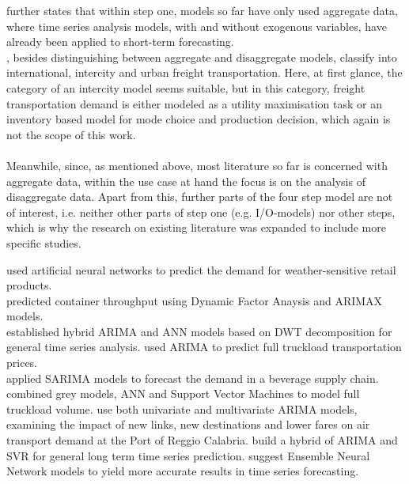 \documentclass[a4paper, 11pt]{article}
\begin{document}
\cite{JONG.2004} further states that within step one, models so far have only used aggregate data, where time series analysis models, with and without exogenous variables, have already been applied to short-term forecasting.\\
\cite{Regan.2001}, besides distinguishing between aggregate and disaggregate models, classify into international, intercity and urban freight transportation. Here, at first glance, the category of an intercity model seems suitable, but in this category, freight transportation demand is either modeled as a utility maximisation task or an inventory based model for mode choice and production decision, which again is not the scope of this work.
\\
\\
Meanwhile,  since, as mentioned above, most literature so far is concerned with aggregate data, within the use case at hand the focus is on the analysis of disaggregate data. 
Apart from this, further parts of the four step model are not of interest, i.e. neither other parts of step one (e.g. I/O-models) nor other steps, which is why the research on existing literature was expanded to include more specific studies. 

\cite{Taghizadeh.2017} used artificial neural networks to predict the demand for weather-sensitive retail products. \\
\cite{Intihar.2017} predicted container throughput using Dynamic Factor Anaysis and ARIMAX models.\\
\cite{Khandelwal.2015} established hybrid ARIMA and ANN models based on DWT decomposition for general time series analysis.
\cite{Miller.2018} used ARIMA to predict full truckload transportation prices.\\
\cite{Mircetic.2016} applied SARIMA models to forecast the demand in a beverage supply chain.\\
\cite{Gao.2011} combined grey models, ANN and Support Vector Machines to model full truckload volume.
\cite{Andreoni.2006b} use both univariate and multivariate ARIMA models, examining the impact of new links, new destinations and lower fares on air transport demand at the Port of Reggio Calabria.
\cite{JoaoF.L.Oliveira.2014} build a hybrid of ARIMA and SVR for general long term time series prediction.
\cite{Kourentzes.2014} suggest Ensemble Neural Network models to yield more accurate results in time series forecasting.
\end{document}
